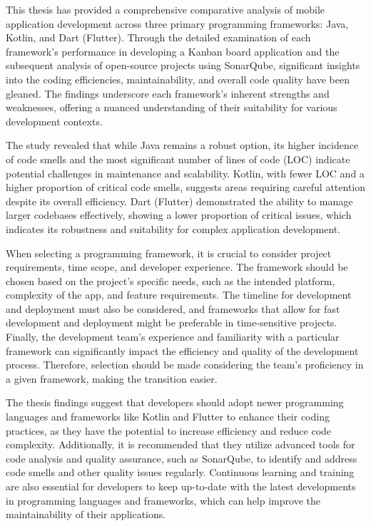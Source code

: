 This thesis has provided a comprehensive comparative analysis of mobile application development across three primary programming frameworks: Java, Kotlin, and Dart (Flutter). Through the detailed examination of each framework's performance in developing a Kanban board application and the subsequent analysis of open-source projects using SonarQube, significant insights into the coding efficiencies, maintainability, and overall code quality have been gleaned. The findings underscore each framework's inherent strengths and weaknesses, offering a nuanced understanding of their suitability for various development contexts.
\par
The study revealed that while Java remains a robust option, its higher incidence of code smells and the most significant number of lines of code (LOC) indicate potential challenges in maintenance and scalability. Kotlin, with fewer LOC and a higher proportion of critical code smells, suggests areas requiring careful attention despite its overall efficiency. Dart (Flutter) demonstrated the ability to manage larger codebases effectively, showing a lower proportion of critical issues, which indicates its robustness and suitability for complex application development.
\par
When selecting a programming framework, it is crucial to consider project requirements, time scope, and developer experience. The framework should be chosen based on the project's specific needs, such as the intended platform, complexity of the app, and feature requirements. The timeline for development and deployment must also be considered, and frameworks that allow for fast development and deployment might be preferable in time-sensitive projects. Finally, the development team's experience and familiarity with a particular framework can significantly impact the efficiency and quality of the development process. Therefore, selection should be made considering the team's proficiency in a given framework, making the transition easier.
\par
The thesis findings suggest that developers should adopt newer programming languages and frameworks like Kotlin and Flutter to enhance their coding practices, as they have the potential to increase efficiency and reduce code complexity. Additionally, it is recommended that they utilize advanced tools for code analysis and quality assurance, such as SonarQube, to identify and address code smells and other quality issues regularly. Continuous learning and training are also essential for developers to keep up-to-date with the latest developments in programming languages and frameworks, which can help improve the maintainability of their applications.
